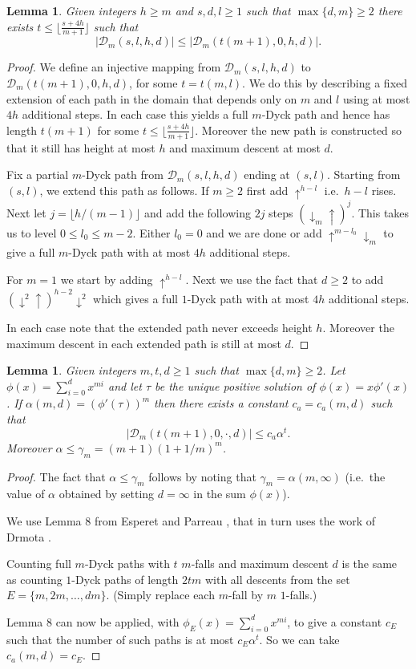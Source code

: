 \documentclass[12]{article}
\def\dyckm{\downarrow_{m}}
\def\dycku{\uparrow}
\def\dycko{\downarrow}
\newtheorem{lem}[thm]{Lemma}
\begin{document}
\begin{lem}\label{full:lem}
  Given integers $h\geq m$ and $s,d,l\geq 1$ such that $\max\{d,m\}\geq 2$
  there exists $t\leq \lfloor \frac{s+4h}{m+1}\rfloor$ such that  \[|\mathcal{D}_m(s,l,h,d)|\leq |\mathcal{D}_m(t(m+1),0,h,d)|.\] 
\end{lem} 
\begin{proof} We  define an injective  mapping from $\mathcal{D}_m(s,l,h,d)$ to $\mathcal{D}_m(t(m+1),0,h,d)$, for some $t=t(m,l)$. We do this by describing a fixed extension of each path in the domain that depends only on $m$ and $l$  using at most  $4h$ additional steps. In each case this yields a full $m$-Dyck path and hence  has length $t(m+1)$ for some $t\leq \lfloor \frac{s+4h}{m+1}\rfloor$. Moreover the new path is constructed so that it still has height at most $h$ and maximum descent at most $d$.


Fix a partial $m$-Dyck path from $\mathcal{D}_m(s,l,h,d)$ ending at $(s,l)$. Starting from $(s,l)$, we extend this path as follows. If $m\geq2 $ first add $\dycku^{h-l}$ i.e.~$h-l$ rises. Next let $j=\lfloor h/(m-1)\rfloor$ and add the following $2j$ steps $(\dyckm\dycku)^j$. This takes us to level $0\leq l_0\leq m-2$. Either $l_0=0$ and we are done or add $\dycku^{m-l_0}\dyckm$ to give a full $m$-Dyck path with at most $4h$ additional steps.
  

For $m=1$ we start by adding $\dycku^{h-l}$. Next we use the fact that $d\geq 2$ to add $(\dycko^2\dycku)^{h-2}\dycko^2$ which gives a full $1$-Dyck path with at most  $4h$ additional steps.


In each case note that the extended path never exceeds height $h$. Moreover the maximum descent in each extended path is still at most $d$.
  \end{proof}
\begin{lem}\label{bound1:lem} 
  Given integers $m,t,d\geq 1$ such that $\max\{d,m\}\geq 2$. Let $\phi(x)=\sum_{i=0}^dx^{mi}$ and let $\tau$ be the unique positive solution of $\phi(x)=x\phi'(x)$. If $\alpha(m,d)=(\phi'(\tau))^m$ then there exists a constant $c_{a}=c_{a}(m,d)$ such that 
  \[|\mathcal{D}_m(t(m+1),0,\cdot,d)|\leq c_a\alpha^{t}.\]        
Moreover $\alpha\leq \gamma_m=(m+1)(1+1/m)^m$.
\end{lem}    
\begin{proof}  The fact that $\alpha\leq \gamma_m$ follows by noting that $\gamma_m=\alpha(m,\infty)$ (i.e.~the value of $\alpha$ obtained by setting $d=\infty$ in the sum $\phi(x)$).
  
We use Lemma 8 from Esperet and Parreau \cite{EsperetParreau}, that in turn uses the work of Drmota \cite{Drmota}.

Counting full $m$-Dyck paths with $t$ $m$-falls and maximum descent $d$ is the same as counting $1$-Dyck paths of length $2tm$ with all descents from the set $E=\{m,2m,\ldots,dm\}$. (Simply replace each $m$-fall by $m$ $1$-falls.)

Lemma 8 \cite{EsperetParreau} can now be applied, with $\phi_E(x)=\sum_{i=0}^dx^{mi}$, to give a constant $c_E$ such that the number of such paths is at most $c_E\alpha^t$. So we can take $c_{a}(m,d)=c_E$.
\end{proof}      
\end{document}
